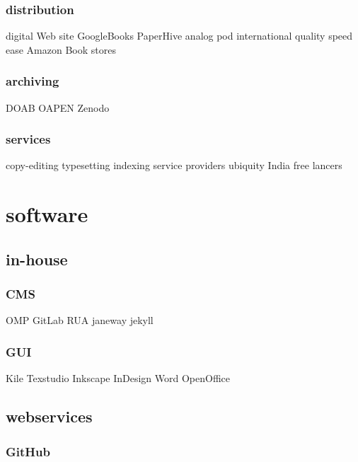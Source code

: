 \documentclass[output=guidelines,guidelines] {langscibook}
\begin{document}
\subsubsection{distribution}
                    digital
                        Web site
                        GoogleBooks
                        PaperHive
                    analog
                        pod
                            international
                            quality
                            speed
                            ease
                        Amazon
                        Book stores
\subsubsection{archiving}
                    DOAB
                    OAPEN
                    Zenodo
\subsubsection{services}
                    copy-editing
                    typesetting
                    indexing
                    service providers
                        ubiquity
                        India
                        free lancers
\section{software}
\subsection{in-house}
\subsubsection{CMS}
                    OMP
                    GitLab
                    RUA
                    janeway
                    jekyll
\subsubsection{GUI}
                    Kile
                    Texstudio
                    Inkscape
                    InDesign
                    Word
                    OpenOffice
\subsection{webservices}
\subsubsection{GitHub}
\end{document}
